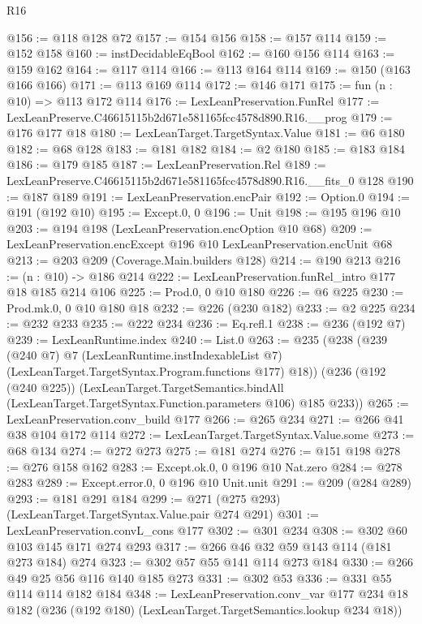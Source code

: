 \begin{lexlean}{R16}
\begin{coremodule}
@156 := @118 @128 @72
@157 := @154 @156
@158 := @157 @114
@159 := @152 @158
@160 := instDecidableEqBool
@162 := @160 @156 @114
@163 := @159 @162
@164 := @117 @114
@166 := @113 @164 @114
@169 := @150 (@163 @166 @166)
@171 := @113 @169 @114
@172 := @146 @171
@175 := fun (n : @10) => @113 @172 @114
@176 := LexLeanPreservation.FunRel
@177 := LexLeanPreserve.C46615115b2d671e581165fcc4578d890.R16.__prog
@179 := @176 @177 @18
@180 := LexLeanTarget.TargetSyntax.Value
@181 := @6 @180
@182 := @68 @128
@183 := @181 @182
@184 := @2 @180
@185 := @183 @184
@186 := @179 @185
@187 := LexLeanPreservation.Rel
@189 := LexLeanPreserve.C46615115b2d671e581165fcc4578d890.R16.__fits_0 @128
@190 := @187 @189
@191 := LexLeanPreservation.encPair
@192 := Option.{0}
@194 := @191 (@192 @10)
@195 := Except.{0, 0}
@196 := Unit
@198 := @195 @196 @10
@203 := @194 @198 (LexLeanPreservation.encOption @10 @68)
@209 := LexLeanPreservation.encExcept @196 @10 LexLeanPreservation.encUnit @68
@213 := @203 @209 (Coverage.Main.builders @128)
@214 := @190 @213
@216 := (n : @10) -> @186 @214
@222 := LexLeanPreservation.funRel_intro @177 @18 @185 @214 @106
@225 := Prod.{0, 0} @10 @180
@226 := @6 @225
@230 := Prod.mk.{0, 0} @10 @180 @18
@232 := @226 (@230 @182)
@233 := @2 @225
@234 := @232 @233
@235 := @222 @234
@236 := Eq.refl.{1}
@238 := @236 (@192 @7)
@239 := LexLeanRuntime.index
@240 := List.{0}
@263 := @235
    (@238
      (@239
        (@240 @7)
        @7
        (LexLeanRuntime.instIndexableList @7)
        (LexLeanTarget.TargetSyntax.Program.functions @177)
        @18))
    (@236
      (@192 (@240 @225))
      (LexLeanTarget.TargetSemantics.bindAll
        (LexLeanTarget.TargetSyntax.Function.parameters @106)
        @185
        @233))
@265 := LexLeanPreservation.conv_build @177
@266 := @265 @234
@271 := @266 @41 @38 @104 @172 @114
@272 := LexLeanTarget.TargetSyntax.Value.some
@273 := @68 @134
@274 := @272 @273
@275 := @181 @274
@276 := @151 @198
@278 := @276 @158 @162
@283 := Except.ok.{0, 0} @196 @10 Nat.zero
@284 := @278 @283
@289 := Except.error.{0, 0} @196 @10 Unit.unit
@291 := @209 (@284 @289)
@293 := @181 @291 @184
@299 := @271 (@275 @293) (LexLeanTarget.TargetSyntax.Value.pair @274 @291)
@301 := LexLeanPreservation.convL_cons @177
@302 := @301 @234
@308 := @302 @60 @103 @145 @171 @274 @293
@317 := @266 @46 @32 @59 @143 @114 (@181 @273 @184) @274
@323 := @302 @57 @55 @141 @114 @273 @184
@330 := @266 @49 @25 @56 @116 @140 @185 @273
@331 := @302 @53
@336 := @331 @55 @114 @114 @182 @184
@348 := LexLeanPreservation.conv_var
    @177
    @234
    @18
    @182
    (@236 (@192 @180) (LexLeanTarget.TargetSemantics.lookup @234 @18))

\end{coremodule}
\end{lexlean}
